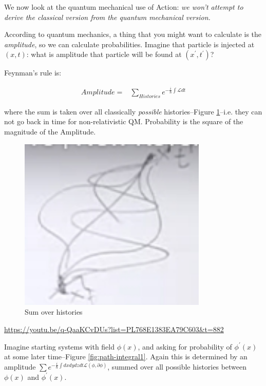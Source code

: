 \documentclass[]{article}
\begin{document}
We now look at the quantum mechanical use of Action: \emph{we won't attempt to derive the classical version from the quantum mechanical version.}

According to quantum mechanics, a thing that you might want to calculate is the \emph{amplitude}, so we can calculate probabilities. Imagine that particle is injected at $(x,t)$: what is amplitude that particle will be found at $(x^\prime,t^\prime)$?

Feynman's rule is:

\begin{align*}
	Amplitude =& \sum_{Histories} e^{-\frac{i}{\hslash} \int \mathcal{L} dt}
\end{align*}

where the sum is taken over all classically \emph{possible} histories--Figure \ref{fig:sum:histories}--i.e. they can not go back in time for non-relativistic QM. Probability is the square of the magnitude of the Amplitude.

\begin{figure}[H]
	\caption{Sum over histories}\label{fig:sum:histories}
	\includegraphics[width=0.8\textwidth]{sum-histories}
\end{figure}

\url{https://youtu.be/q-QaaKCvDUs?list=PL768E1383EA79C603&t=882}

Imagine starting systems with field $\phi(x)$, and asking for probability of $\phi^\prime(x)$ at some later time--Figure \ref{fig:path-integral1}. Again this is determined by an amplitude $\sum e^{-\frac{i}{\hslash} \int dx dy dz dt\mathcal{L}(\phi,\partial \phi) }$, summed over all possible histories between $\phi(x)$ and $\phi^\prime(x)$.
\end{document}
